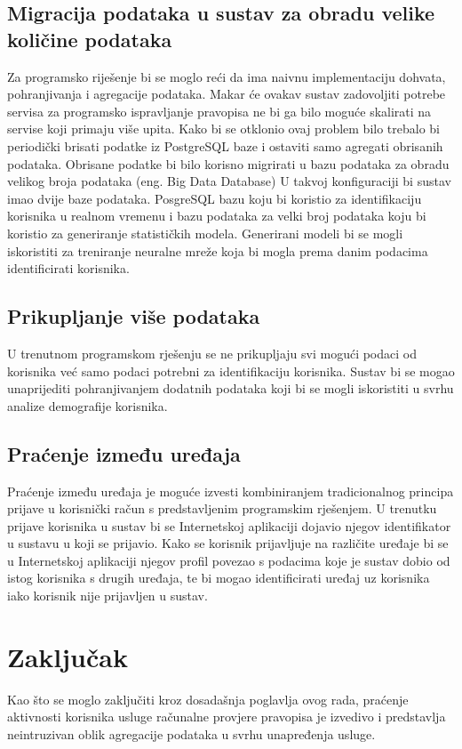 \documentclass[times, utf8, zavrsni]{fer}
\begin{document}
\section{Migracija podataka u sustav za obradu velike količine podataka}
Za programsko riješenje bi se moglo reći da ima naivnu implementaciju dohvata,
pohranjivanja i agregacije podataka. Makar će ovakav sustav zadovoljiti potrebe
servisa za programsko ispravljanje pravopisa ne bi ga bilo moguće skalirati na
servise koji primaju više upita. Kako bi se otklonio ovaj problem bilo trebalo
bi periodički brisati podatke iz PostgreSQL baze i ostaviti samo agregati
obrisanih podataka. Obrisane podatke bi bilo korisno migrirati u bazu podataka
za obradu velikog broja podataka (eng. Big Data Database) \cite{mongodb2015bde}
U takvoj
konfiguraciji bi sustav imao dvije baze podataka. PosgreSQL bazu koju bi
koristio za identifikaciju korisnika u realnom vremenu i bazu podataka za velki
broj podataka koju bi koristio za generiranje statističkih modela. Generirani
modeli bi se mogli iskoristiti za treniranje neuralne mreže koja bi mogla prema
danim podacima identificirati korisnika.

\section{Prikupljanje više podataka}
U trenutnom programskom rješenju se ne prikupljaju svi mogući podaci od
korisnika već samo podaci potrebni za identifikaciju korisnika. Sustav bi se
mogao unaprijediti pohranjivanjem dodatnih podataka koji bi se mogli iskoristiti
u svrhu analize demografije korisnika.

\section{Praćenje između uređaja}
Praćenje između uređaja je moguće izvesti kombiniranjem tradicionalnog principa
prijave u korisnički račun s predstavljenim programskim rješenjem. U trenutku
prijave korisnika u sustav bi se Internetskoj aplikaciji dojavio njegov
identifikator u sustavu u koji se prijavio. Kako se korisnik prijavljuje na
različite uređaje bi se u Internetskoj aplikaciji njegov profil povezao s
podacima koje je sustav dobio od istog korisnika s drugih uređaja, te bi mogao
identificirati uređaj uz korisnika iako korisnik nije prijavljen u sustav.

\chapter{Zaključak}
Kao što se moglo zaključiti kroz dosadašnja poglavlja ovog rada, praćenje
aktivnosti korisnika usluge računalne provjere pravopisa je izvedivo i
predstavlja neintruzivan oblik agregacije podataka u svrhu unapređenja usluge.
\end{document}
